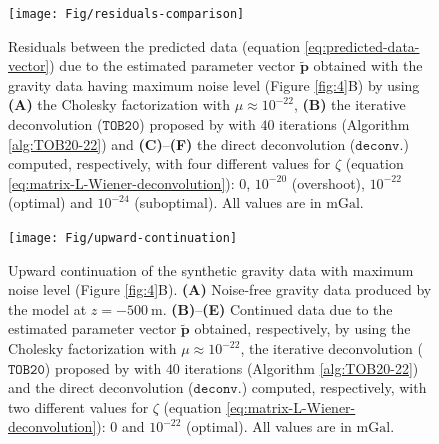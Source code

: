 \begin{figure}[htbp]
	\begin{center}
		\texttt{[image: Fig/residuals-comparison]}
	\end{center}
	\caption{
		Residuals between the predicted data (equation \ref{eq:predicted-data-vector}) due to the estimated parameter vector
		$\tilde{\mathbf{p}}$ obtained with the gravity data having maximum noise level (Figure \ref{fig:4}B) by using
		\textbf{(A)} the Cholesky factorization with $\mu \approx 10^{-22}$, 
		\textbf{(B)} the iterative deconvolution ($\mathtt{TOB20}$) proposed by \citet{takahashi-etal2020} with $40$ 
		iterations (Algorithm \ref{alg:TOB20-22}) and
		\textbf{(C)}--\textbf{(F)} the direct deconvolution ($\mathtt{deconv.}$) computed, respectively, with four different 
		values for $\zeta$ (equation \ref{eq:matrix-L-Wiener-deconvolution}): $0$, $10^{-20}$ (overshoot), $10^{-22}$ (optimal)
		and $10^{-24}$ (suboptimal).
		All values are in $\mathrm{mGal}$.
		}
	\label{fig:residuals-comparison}
\end{figure}

\begin{figure}[htbp]
	\begin{center}
		\texttt{[image: Fig/upward-continuation]}
	\end{center}
	\caption{
		Upward continuation of the synthetic gravity data with maximum noise level (Figure \ref{fig:4}B).
		\textbf{(A)} Noise-free gravity data produced by the model at $z = -500 \: \mathrm{m}$. 
		\textbf{(B)}--\textbf{(E)} Continued data due to the estimated parameter vector $\tilde{\mathbf{p}}$ obtained, respectively,
		by using the Cholesky factorization with $\mu \approx 10^{-22}$, 
		the iterative deconvolution ($\mathtt{TOB20}$) proposed by \citet{takahashi-etal2020} with $40$ 
		iterations (Algorithm \ref{alg:TOB20-22}) and
		the direct deconvolution ($\mathtt{deconv.}$) computed, respectively, with two different 
		values for $\zeta$ (equation \ref{eq:matrix-L-Wiener-deconvolution}): $0$ and $10^{-22}$ (optimal).
		All values are in $\mathrm{mGal}$.
		}
	\label{fig:upward-continuation}
\end{figure}

